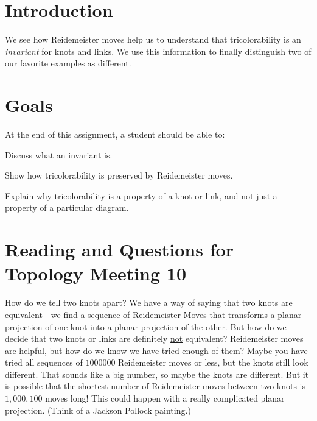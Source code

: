 \documentclass[12pt,letterpaper]{article}
\theoremstyle{definition}
\begin{document}
\setlength{\parskip}{1ex plus 0.5ex minus 0.2ex}
\setlength{\parindent}{0pt}

\pagestyle{fancy}
\cfoot{}

\section*{Introduction}
We see how Reidemeister moves help us to understand that tricolorability is an \emph{invariant} for knots and links. We use this information to finally distinguish two of our favorite examples as different.

\section*{Goals}
At the end of this assignment, a student should be able to:
\begin{compactitem}
\item Discuss what an invariant is.
\item Show how tricolorability is preserved by Reidemeister moves.
\item Explain why tricolorability is a property of a knot or link, and not just a property of a particular diagram.
\end{compactitem}


\section*{Reading and Questions for Topology Meeting 10}

How do we tell two knots apart?
We have a way of saying that two knots are equivalent---we find a sequence of Reidemeister Moves that transforms a planar projection of one knot into a planar projection of the other.
But how do we decide that two  knots or links are definitely \underline{not} equivalent?
Reidemeister moves are helpful, but how do we know we have tried enough of them?
Maybe you have tried all sequences of $1000000$ Reidemeister moves or less, but the knots still look different.
That sounds like a big number, so maybe the knots are different.
But it is possible that the shortest number of Reidemeister moves between two knots is $1,000,100$ moves long!
This could happen with a really complicated planar projection.
(Think of a Jackson Pollock painting.)
\end{document}
